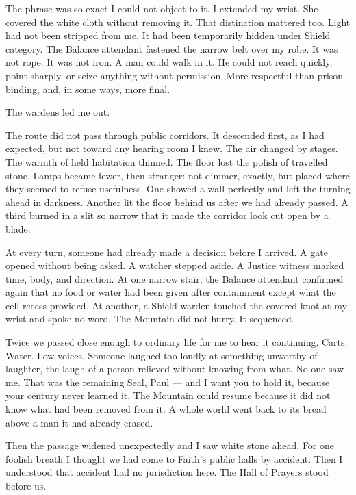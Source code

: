 The phrase was so exact I could not object to it. I extended my wrist. She covered the white cloth without removing it. That distinction mattered too. Light had not been stripped from me. It had been temporarily hidden under Shield category. The Balance attendant fastened the narrow belt over my robe. It was not rope. It was not iron. A man could walk in it. He could not reach quickly, point sharply, or seize anything without permission. More respectful than prison binding, and, in some ways, more final.\par

The wardens led me out.\par

The route did not pass through public corridors. It descended first, as I had expected, but not toward any hearing room I knew. The air changed by stages. The warmth of held habitation thinned. The floor lost the polish of travelled stone. Lamps became fewer, then stranger: not dimmer, exactly, but placed where they seemed to refuse usefulness. One showed a wall perfectly and left the turning ahead in darkness. Another lit the floor behind us after we had already passed. A third burned in a slit so narrow that it made the corridor look cut open by a blade.\par

At every turn, someone had already made a decision before I arrived. A gate opened without being asked. A watcher stepped aside. A Justice witness marked time, body, and direction. At one narrow stair, the Balance attendant confirmed again that no food or water had been given after containment except what the cell recess provided. At another, a Shield warden touched the covered knot at my wrist and spoke no word. The Mountain did not hurry. It sequenced.\par

Twice we passed close enough to ordinary life for me to hear it continuing. Carts. Water. Low voices. Someone laughed too loudly at something unworthy of laughter, the laugh of a person relieved without knowing from what. No one saw me. That was the remaining Seal, Paul --- and I want you to hold it, because your century never learned it. The Mountain could resume because it did not know what had been removed from it. A whole world went back to its bread above a man it had already erased.\par

Then the passage widened unexpectedly and I saw white stone ahead. For one foolish breath I thought we had come to Faith's public halls by accident. Then I understood that accident had no jurisdiction here. The Hall of Prayers stood before us.\par

